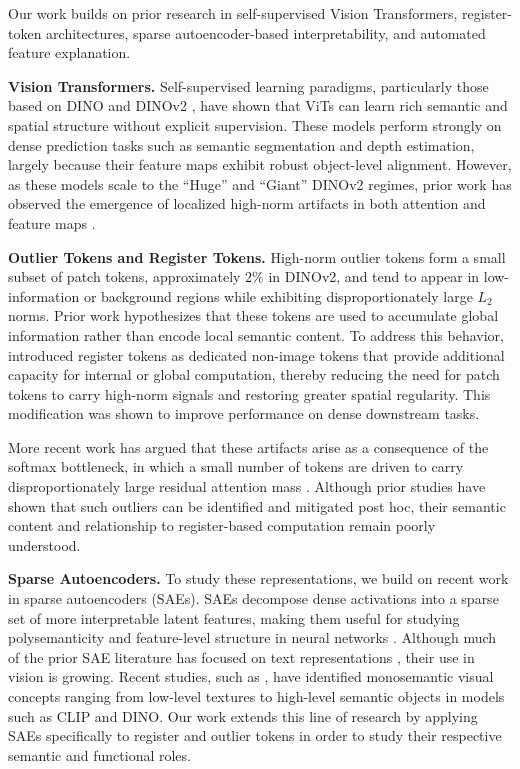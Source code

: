 \documentclass{article}
\theoremstyle{plain}
\theoremstyle{definition}
\theoremstyle{remark}
\begin{document}
Our work builds on prior research in self-supervised Vision Transformers, register-token architectures, sparse autoencoder-based interpretability, and automated feature explanation.

\textbf{Vision Transformers.} Self-supervised learning paradigms, particularly those based on DINO \citep{caron2021emerging} and DINOv2 \citep{oquab2023dinov2}, have shown that ViTs can learn rich semantic and spatial structure without explicit supervision. These models perform strongly on dense prediction tasks such as semantic segmentation and depth estimation, largely because their feature maps exhibit robust object-level alignment. However, as these models scale to the ``Huge'' and ``Giant'' DINOv2 regimes, prior work has observed the emergence of localized high-norm artifacts in both attention and feature maps \citep{darcet2023vision}.

\textbf{Outlier Tokens and Register Tokens.} High-norm outlier tokens form a small subset of patch tokens, approximately $2\%$ in DINOv2, and tend to appear in low-information or background regions while exhibiting disproportionately large $L_2$ norms. Prior work hypothesizes that these tokens are used to accumulate global information rather than encode local semantic content. To address this behavior, \citet{darcet2023vision} introduced register tokens as dedicated non-image tokens that provide additional capacity for internal or global computation, thereby reducing the need for patch tokens to carry high-norm signals and restoring greater spatial regularity. This modification was shown to improve performance on dense downstream tasks.

More recent work has argued that these artifacts arise as a consequence of the softmax bottleneck, in which a small number of tokens are driven to carry disproportionately large residual attention mass \citep{jiang2025vision}. Although prior studies have shown that such outliers can be identified and mitigated post hoc, their semantic content and relationship to register-based computation remain poorly understood.

\textbf{Sparse Autoencoders.} To study these representations, we build on recent work in sparse autoencoders (SAEs). SAEs decompose dense activations into a sparse set of more interpretable latent features, making them useful for studying polysemanticity and feature-level structure in neural networks \citep{cunningham2023sparse}. Although much of the prior SAE literature has focused on text representations \citep{gao2024scaling, templeton2024scaling}, their use in vision is growing. Recent studies, such as \citet{fel2025archetypal}, have identified monosemantic visual concepts ranging from low-level textures to high-level semantic objects in models such as CLIP and DINO. Our work extends this line of research by applying SAEs specifically to register and outlier tokens in order to study their respective semantic and functional roles.
\end{document}
